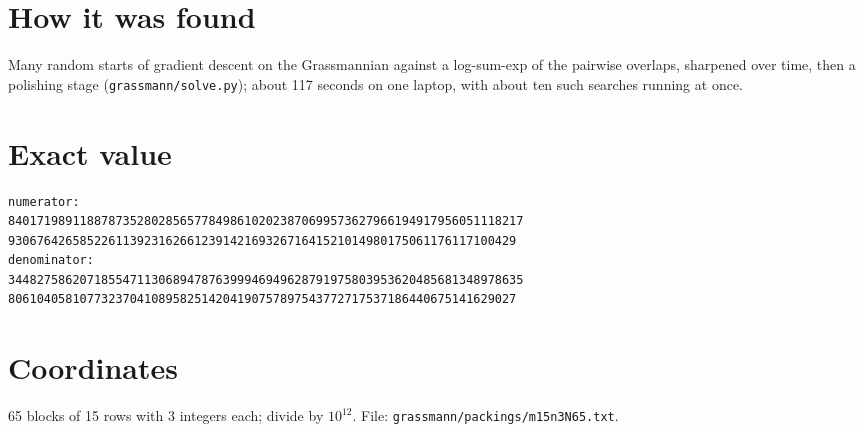 \documentclass[11pt,a4paper]{article}
\begin{document}
\section{How it was found}
Many random starts of gradient descent on the Grassmannian against a log-sum-exp of the pairwise overlaps, sharpened over time, then a polishing stage (\texttt{grassmann/solve.py}); about 117 seconds on one laptop, with about ten such searches running at once.


\appendix
\section{Exact value}
{\small
\begin{verbatim}
numerator:
840171989118878735280285657784986102023870699573627966194917956051118217
93067642658522611392316266123914216932671641521014980175061176117100429
denominator:
344827586207185547113068947876399946949628791975803953620485681348978635
80610405810773237041089582514204190757897543772717537186440675141629027
\end{verbatim}}

\section{Coordinates}
65 blocks of 15 rows with 3 integers each; divide by $10^{12}$. File: \texttt{grassmann/packings/m15n3N65.txt}.
{\tiny
\begin{multicols}{3}
\end{multicols}}
\end{document}
